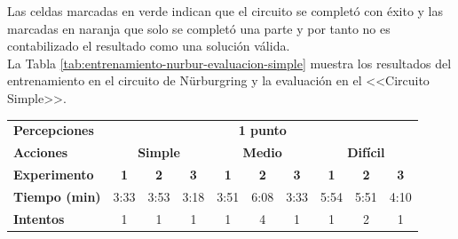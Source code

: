 Las celdas marcadas en verde indican que el circuito se completó con éxito y las marcadas en naranja que solo se completó una parte y por tanto no es contabilizado el resultado como una solución válida.\\

La Tabla \ref{tab:entrenamiento-nurbur-evaluacion-simple} muestra los resultados del entrenamiento en el circuito de Nürburgring y la evaluación en el <<Circuito Simple>>.\\

\newpage

\begin{table}[ht!]
\centering
\begin{tabular}{|l|c|c|c|c|c|c|c|c|c|}
\hline
\rowcolor[HTML]{EFEFEF} 
\multicolumn{10}{|c|}{\cellcolor[HTML]{EFEFEF}\textbf{Entrenamiento en Nürburgring y ejecución en <<Circuito Simple>>}}                                                                                                                                                       \\ \hline
\rowcolor[HTML]{EFEFEF} 
\textbf{Percepciones}                     & \multicolumn{9}{c|}{\cellcolor[HTML]{EFEFEF}\textbf{1 punto}}                                                                                                                                                         \\ \hline
\rowcolor[HTML]{EFEFEF} 
\textbf{Acciones}                                 & \multicolumn{3}{c|}{\cellcolor[HTML]{EFEFEF}\textbf{Simple}}             & \multicolumn{3}{c|}{\cellcolor[HTML]{EFEFEF}\textbf{Medio}}                & \multicolumn{3}{c|}{\cellcolor[HTML]{EFEFEF}\textbf{Difícil}} \\ \hline
\rowcolor[HTML]{EFEFEF} 
\textbf{Experimento}                              & \textbf{1}                    & \textbf{2} & \textbf{3}                  & \textbf{1}                    & \textbf{2}                    & \textbf{3} & \textbf{1}          & \textbf{2}         & \textbf{3}         \\ \hline
\cellcolor[HTML]{EFEFEF}\textbf{Tiempo (min)} & 3:33                          & 3:53       & \cellcolor[HTML]{32CB00}3:18                        & 3:51                          & 6:08                          & 3:33       & 5:54                & 5:51               & 4:10               \\ \hline
\cellcolor[HTML]{EFEFEF}\textbf{Intentos}         & 1                             & 1          & 1                           & 1                             & 4                             & 1          & 1                   & 2                  & 1                  \\ \hline

\end{tabular}
\end{table}
